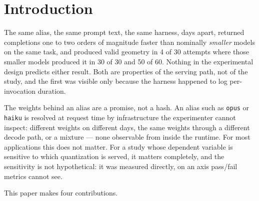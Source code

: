 \hypertarget{introduction}{%
\section{Introduction}\label{introduction}}

The same alias, the same prompt text, the same harness, days apart, returned completions one to two orders of magnitude faster than nominally \emph{smaller} models on the same task, and produced valid geometry in 4 of 30 attempts where those smaller models produced it in 30 of 30 and 50 of 60. Nothing in the experimental design predicts either result. Both are properties of the serving path, not of the study, and the first was visible only because the harness happened to log per-invocation duration.

The weights behind an alias are a promise, not a hash. An alias such as \texttt{opus} or \texttt{haiku} is resolved at request time by infrastructure the experimenter cannot inspect: different weights on different days, the same weights through a different decode path, or a mixture --- none observable from inside the runtime. For most applications this does not matter. For a study whose dependent variable is sensitive to which quantization is served, it matters completely, and the sensitivity is not hypothetical: it was measured directly, on an axis pass/fail metrics cannot see.

This paper makes four contributions.

